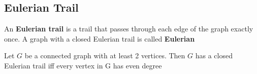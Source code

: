 \subsection{Eulerian Trail}

\begin{definition}\label{1.15}
    An \textbf{Eulerian trail} is a trail that passes through each edge of the graph exactly once. A graph with a closed Eulerian trail is called \textbf{Eulerian}
\end{definition}
\vspace{0.5cm}
\begin{theorem}\label{1.16}
    Let $G$ be a connected graph with at least 2 vertices. Then $G$ has a closed Eulerian trail iff every vertex in G has even degree
\end{theorem}
